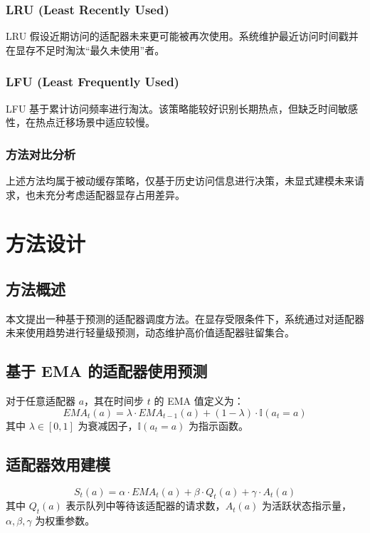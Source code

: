 \subsubsection{LRU (Least Recently Used)}
LRU 假设近期访问的适配器未来更可能被再次使用。系统维护最近访问时间戳并在显存不足时淘汰“最久未使用”者。

\subsubsection{LFU (Least Frequently Used)}
LFU 基于累计访问频率进行淘汰。该策略能较好识别长期热点，但缺乏时间敏感性，在热点迁移场景中适应较慢。

\subsubsection{方法对比分析}
上述方法均属于被动缓存策略，仅基于历史访问信息进行决策，未显式建模未来请求，也未充分考虑适配器显存占用差异。

\section{方法设计}
\subsection{方法概述}
本文提出一种基于预测的适配器调度方法。在显存受限条件下，系统通过对适配器未来使用趋势进行轻量级预测，动态维护高价值适配器驻留集合。

\subsection{基于 EMA 的适配器使用预测}
对于任意适配器 $a$，其在时间步 $t$ 的 EMA 值定义为：
\begin{equation}
EMA_t(a)=\lambda\cdot EMA_{t-1}(a)+(1-\lambda)\cdot\mathbb{I}(a_t=a)
\end{equation}
其中 $\lambda\in[0,1]$ 为衰减因子，$\mathbb{I}(a_t=a)$ 为指示函数。

\subsection{适配器效用建模}
\begin{equation}
S_t(a)=\alpha\cdot EMA_t(a)+\beta\cdot Q_t(a)+\gamma\cdot A_t(a)
\end{equation}
其中 $Q_t(a)$ 表示队列中等待该适配器的请求数，$A_t(a)$ 为活跃状态指示量，$\alpha,\beta,\gamma$ 为权重参数。

